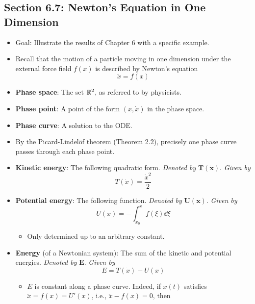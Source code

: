 \documentclass[../notes.tex]{subfiles}
\begin{document}
\subsection*{Section 6.7: Newton's Equation in One Dimension}
\begin{itemize}
    \item Goal: Illustrate the results of Chapter 6 with a specific example.
    \item Recall that the motion of a particle moving in one dimension under the external force field $f(x)$ is described by Newton's equation
    \begin{equation*}
        \ddot{x} = f(x)
    \end{equation*}
    \item \textbf{Phase space}: The set $\mathbb{R}^2$, as referred to by physicists.
    \item \textbf{Phase point}: A point of the form $(x,\dot{x})$ in the phase space.
    \item \textbf{Phase curve}: A solution to the ODE.
    \item By the Picard-Lindel\"{o}f theorem (Theorem 2.2), precisely one phase curve passes through each phase point.
    \item \textbf{Kinetic energy}: The following quadratic form. \emph{Denoted by} $\bm{T(\dot{x})}$. \emph{Given by}
    \begin{equation*}
        T(\dot{x}) = \frac{\dot{x}^2}{2}
    \end{equation*}
    \item \textbf{Potential energy}: The following function. \emph{Denoted by} $\bm{U(x)}$. \emph{Given by}
    \begin{equation*}
        U(x) = -\int_{x_0}^xf(\xi)\dd\xi
    \end{equation*}
    \begin{itemize}
        \item Only determined up to an arbitrary constant.
    \end{itemize}
    \item \textbf{Energy} (of a Newtonian system): The sum of the kinetic and potential energies. \emph{Denoted by} $\bm{E}$. \emph{Given by}
    \begin{equation*}
        E = T(\dot{x})+U(x)
    \end{equation*}
    \begin{itemize}
        \item $E$ is constant along a phase curve. Indeed, if $x(t)$ satisfies $\ddot{x}=f(x)=U'(x)$, i.e., $\ddot{x}-f(x)=0$, then

\end{itemize}
\end{itemize}
\end{document}

